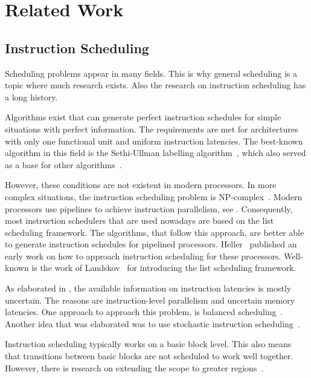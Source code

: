 \chapter{Related Work}

\section{Instruction Scheduling}
\label{sec:rw:instruction-scheduling}
Scheduling problems appear in many fields.
This is why general scheduling is a topic where much research exists.
Also the research on instruction scheduling has a long history.

Algorithms exist that can generate perfect instruction schedules for simple situations with perfect information.
The requirements are met for architectures with only one functional unit and uniform instruction latencies.
The best-known algorithm in this field is the Sethi-Ullman labelling algorithm~\cite{sethi1970generation}, which also served as a base for other algorithms~\cite{proebsting1991linear}.

However, these conditions are not existent in modern processors.
In more complex situations, the instruction scheduling problem is NP-complex~\cite{hennessy1983postpass}.
Modern processors use pipelines to achieve instruction parallelism, see .
Consequently, most instruction schedulers that are used nowadays are based on the list scheduling framework.
The algorithms, that follow this approach, are better able to generate instruction schedules for pipelined processors.
Heller~\cite{heller1961sequencing} published an early work on how to approach instruction scheduling for these processors.
Well-known is the work of Landskov~\cite{landskov1980local} for introducing the list scheduling framework.

As elaborated in , the available information on instruction latencies is mostly uncertain.
The reasons are instruction-level parallelism and uncertain memory latencies.
One approach to approach this problem, is balanced scheduling~\cite{kerns1993balanced,lo1995improving}.
Another idea that was elaborated was to use stochastic instruction scheduling~\cite{schielke2000stochastic}.

Instruction scheduling typically works on a basic block level.
This also means that transitions between basic blocks are not scheduled to work well together.
However, there is research on extending the scope to greater regions~\cite{fisher1981trace,bernstein1991global,hwu1993superblock}.

